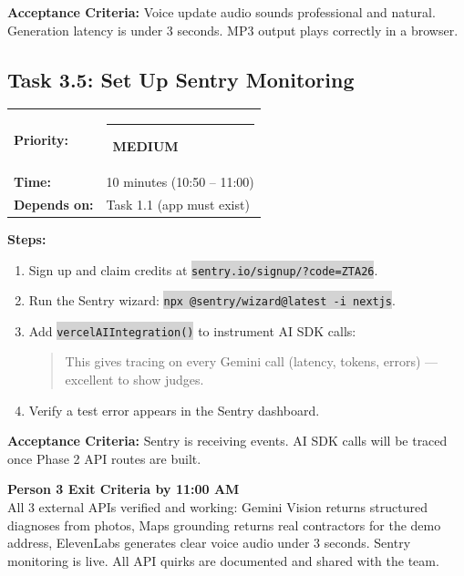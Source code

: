 \documentclass[11pt, a4paper]{article}
\newcommand{\medpri}{\textcolor{medgreen}{\rule{6pt}{6pt}}~\textcolor{medgreen}{\scriptsize\textbf{MEDIUM}}}
\newcommand{\code}[1]{\texttt{\small\colorbox{lightgray}{#1}}}
\begin{document}
\textbf{Acceptance Criteria:} Voice update audio sounds professional and natural. Generation latency is under 3 seconds. MP3 output plays correctly in a browser.

\vspace{1em}

\subsection{Task 3.5: Set Up Sentry Monitoring}

\begin{tabularx}{\textwidth}{lX}
\textbf{Priority:} & \medpri \\
\textbf{Time:} & 10 minutes (10:50 -- 11:00) \\
\textbf{Depends on:} & Task 1.1 (app must exist) \\
\end{tabularx}

\vspace{0.3em}

\textbf{Steps:}
\begin{enumerate}[leftmargin=2em, itemsep=2pt]
  \item Sign up and claim credits at \code{sentry.io/signup/?code=ZTA26}.
  \item Run the Sentry wizard: \code{npx @sentry/wizard@latest -i nextjs}.
  \item Add \code{vercelAIIntegration()} to instrument AI SDK calls:
    \begin{quote}
    This gives tracing on every Gemini call (latency, tokens, errors) --- excellent to show judges.
    \end{quote}
  \item Verify a test error appears in the Sentry dashboard.
\end{enumerate}

\textbf{Acceptance Criteria:} Sentry is receiving events. AI SDK calls will be traced once Phase 2 API routes are built.

\vspace{0.5em}

\begin{milestonebox}
\textbf{Person 3 Exit Criteria by 11:00 AM}\\[4pt]
All 3 external APIs verified and working: Gemini Vision returns structured diagnoses from photos, Maps grounding returns real contractors for the demo address, ElevenLabs generates clear voice audio under 3 seconds. Sentry monitoring is live. All API quirks are documented and shared with the team.
\end{milestonebox}
\end{document}
